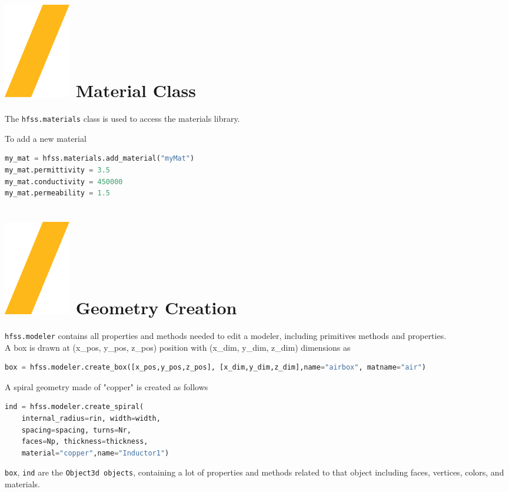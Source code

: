 \documentclass[9pt,landscape]{article}
\begin{document}
\begin{multicols}{3}
\section{\includegraphics[height=\fontcharht\font`\S]{slash.png} Material Class}
The \texttt{hfss.materials} class is used to access the materials library.

To add a new material 
\begin{lstlisting}[language=Python]
my_mat = hfss.materials.add_material("myMat")
my_mat.permittivity = 3.5
my_mat.conductivity = 450000
my_mat.permeability = 1.5
\end{lstlisting}

\section{\includegraphics[height=\fontcharht\font`\S]{slash.png} Geometry Creation}
\texttt{hfss.modeler} contains all properties and methods needed to edit a modeler, including primitives methods and properties.
\newline
\\
A box is drawn at (x\_pos, y\_pos, z\_pos) position with (x\_dim, y\_dim, z\_dim) dimensions as
\begin{lstlisting}[language=Python]
box = hfss.modeler.create_box([x_pos,y_pos,z_pos], [x_dim,y_dim,z_dim],name="airbox", matname="air")
\end{lstlisting}
A spiral geometry made of "copper" is created as follows
\begin{lstlisting}[language=Python]
ind = hfss.modeler.create_spiral(
	internal_radius=rin, width=width,
	spacing=spacing, turns=Nr,
	faces=Np, thickness=thickness,
	material="copper",name="Inductor1")
\end{lstlisting}
\texttt{box}, \texttt{ind} are the \texttt{Object3d objects}, containing a lot of properties and methods related to that object including faces, vertices, colors, and materials.
\vfill
\columnbreak


\end{multicols}
\end{document}
